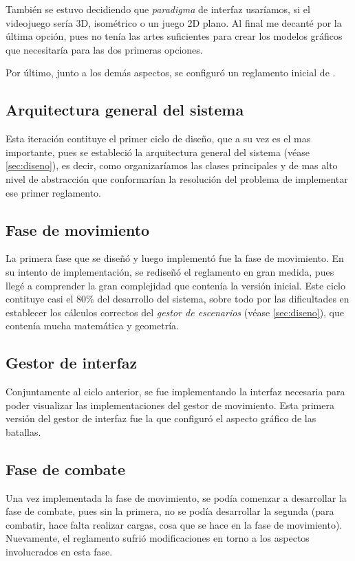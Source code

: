 También se estuvo decidiendo que \emph{paradigma} de interfaz
usaríamos, si el videojuego sería 3D, isométrico o un juego 2D
plano. Al final me decanté por la última opción, pues no tenía las
artes suficientes para crear los modelos gráficos que necesitaría para
las dos primeras opciones.

Por último, junto a los demás aspectos, se configuró un reglamento
inicial de \gom.

\subsection{Arquitectura general del sistema}
Esta iteración contituye el primer ciclo de diseño, que a su vez es el mas
importante, pues se estableció la arquitectura general del sistema
(véase \ref{sec:diseno}), es decir, como organizaríamos las clases
principales y de mas alto nivel de abstracción que conformarían la
resolución del problema de implementar ese primer reglamento.

\subsection{Fase de movimiento}
La primera fase que se diseñó y luego implementó fue la fase de
movimiento. En su intento de implementación, se rediseñó el reglamento
en gran medida, pues llegé a comprender la gran complejidad que
contenía la versión inicial. Este ciclo contituye casi el 80\% del
desarrollo del sistema, sobre todo por las dificultades en establecer
los cálculos correctos del \emph{gestor de escenarios} (véase
\ref{sec:diseno}), que contenía mucha matemática y geometría.

\subsection{Gestor de interfaz}
Conjuntamente al ciclo anterior, se fue implementando la interfaz
necesaria para poder visualizar las implementaciones del gestor de
movimiento. Esta primera versión del gestor de interfaz fue la que
configuró el aspecto gráfico de las batallas.

\subsection{Fase de combate}
Una vez implementada la fase de movimiento, se podía comenzar a
desarrollar la fase de combate, pues sin la primera, no se podía
desarrollar la segunda (para combatir, hace falta realizar
cargas, cosa que se hace en la fase de movimiento). Nuevamente, el
reglamento sufrió modificaciones en torno a los aspectos involucrados
en esta fase.

